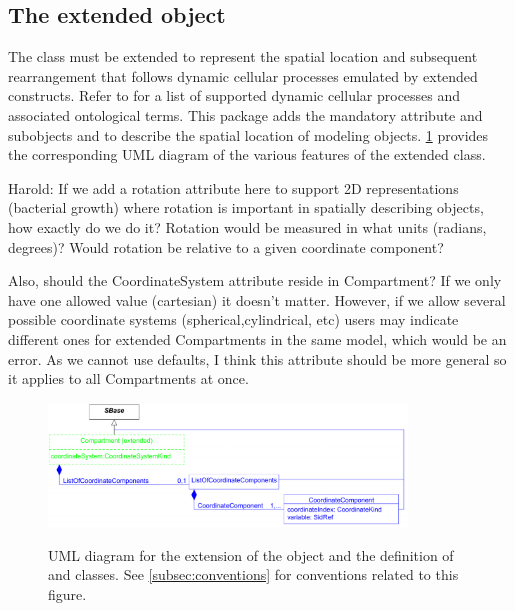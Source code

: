 \subsection{The extended  object}
\label{subsec:extCompartment}

The \Compartment class must be extended to represent the spatial location and subsequent rearrangement that follows dynamic cellular processes emulated by extended \Event constructs. Refer to  for a list of supported dynamic cellular processes and associated ontological terms. This package adds the mandatory attribute  and subobjects \ListOfCoordinateComponents and \CoordinateComponent to describe the spatial location of modeling objects. \ref{fig:UMLExtendedCompartment} provides the corresponding UML diagram of the various features of the extended \Compartment class. 

{\color{red} Harold: \notice If we add a rotation attribute here to support 2D representations (bacterial growth) where rotation is important in spatially describing objects, how exactly do we do it? Rotation would be measured in what units (radians, degrees)? Would rotation be relative to a given coordinate component? 

Also, should the CoordinateSystem attribute reside in Compartment? If we only have one allowed value (cartesian) it doesn't matter. However, if we allow several possible coordinate systems (spherical,cylindrical, etc) users may indicate different ones for extended Compartments in the same model, which would be an error. As we cannot use defaults, I think this attribute should be more general so it applies to all Compartments at once.
}

\begin{figure}[tbhp]
	\centering
	\includegraphics[width=0.85\textwidth]{images/UMLExtendedCompartment.pdf}\\
	\caption{UML diagram for the extension of the \Compartment object and the definition of \ListOfCoordinateComponents and \CoordinateComponent classes. See \ref{subsec:conventions} for conventions related to this figure.} \label{fig:UMLExtendedCompartment}
\end{figure}

